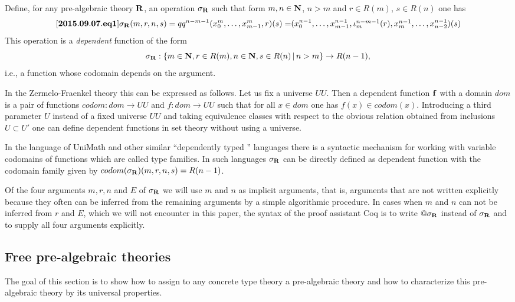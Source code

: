 \documentclass[11pt]{article}
\newenvironment{eq}{\begin{equation}}{\end{equation}}
\newcommand{\llabel}[1]{\label{#1}[{\bf #1}]}
\newcommand{\sr}{\rightarrow}
\newcommand{\nn}{{\bf N\rm}}
\newcommand{\nat}{\nn}
\newcommand{\rr}{{\bf R}}
\begin{document}
Define, for any pre-algebraic theory $\rr$, an operation $\sigma_{\rr}$ such that form $m,n\in\nat$, $n>m$ and $r\in R(m)$, $s\in R(n)$ one has
%
\begin{eq}
\llabel{2015.09.07.eq1}
\sigma_{\rr}(m,r,n,s)=qq^{n-m-1}(x_0^m,\dots,x_{m-1}^m,r)(s)=$$
$$(x_0^{n-1},\dots,x_{m-1}^{n-1},\iota_{m}^{n-m-1}(r),x_m^{n-1},\dots,x_{n-2}^{n-1})(s)
\end{eq}
%
This operation is a {\em dependent} function of the form
%
$$\sigma_{\rr}:\{m\in\nat,r\in R(m),n\in\nat,s\in R(n)\,|\,n>m\}\sr R(n-1),$$
%
i.e., a function whose codomain depends on the argument. 

In the Zermelo-Fraenkel theory this can be expressed as follows. Let us fix a universe $UU$. Then a dependent function ${\bf f}$ with a domain $dom$ is a pair of functions $codom:dom\sr UU$ and $f:dom\sr UU$ such that for all $x\in dom$ one has $f(x)\in codom(x)$.  Introducing a third parameter $U$ instead of a fixed universe $UU$ and taking equivalence classes with respect to the obvious relation obtained from inclusions $U\subset U'$ one can define dependent functions in set theory without using a universe. 

In the language of UniMath and other similar ``dependently typed '' languages there is a syntactic mechanism for working with variable codomains of functions which are called type families. In such languages $\sigma_{\rr}$ can be directly defined as dependent function with the codomain family given by  $codom(\sigma_{\rr})(m,r,n,s)=R(n-1)$. 

Of the four arguments $m,r,n$ and $E$ of $\sigma_{\rr}$ we will use $m$ and $n$ as implicit arguments, that is, arguments that are not written explicitly because they often can be inferred from the remaining arguments by a simple algorithmic procedure. In cases when $m$ and $n$ can not be inferred from $r$ and $E$, which we will not encounter in this paper, the syntax of the proof assistant Coq is to write $@\sigma_{\rr}$ instead of $\sigma_{\rr}$ and to supply all four arguments explicitly. 



\subsection{Free pre-algebraic theories}
%
The goal of this section is to show how to assign to any concrete type theory a pre-algebraic theory and how to characterize this pre-algebraic theory by its universal properties.  
\end{document}
